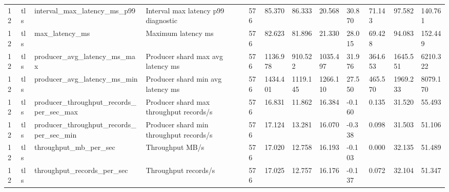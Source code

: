 \begin{longtable}{llllllllllll}
12 & tls & interval\_max\_latency\_ms\_p99 & Interval max latency p99 diagnostic & 576 & 85.370 & 86.333 & 20.568 & 30.870 & 71.143 & 97.582 & 140.761 \\
12 & tls & max\_latency\_ms & Maximum latency ms & 576 & 82.623 & 81.896 & 21.330 & 28.015 & 69.428 & 94.083 & 152.449 \\
12 & tls & producer\_avg\_latency\_ms\_max & Producer shard max avg latency ms & 576 & 1136.978 & 910.522 & 1035.497 & 31.976 & 364.653 & 1645.551 & 6210.322 \\
12 & tls & producer\_avg\_latency\_ms\_min & Producer shard min avg latency ms & 576 & 1434.401 & 1119.145 & 1266.110 & 27.550 & 465.570 & 1969.233 & 8079.170 \\
12 & tls & producer\_throughput\_records\_per\_sec\_max & Producer shard max throughput records/s & 576 & 16.831 & 11.862 & 16.384 & -0.160 & 0.135 & 31.520 & 55.493 \\
12 & tls & producer\_throughput\_records\_per\_sec\_min & Producer shard min throughput records/s & 576 & 17.124 & 13.281 & 16.070 & -0.338 & 0.098 & 31.503 & 51.106 \\
12 & tls & throughput\_mb\_per\_sec & Throughput MB/s & 576 & 17.020 & 12.758 & 16.193 & -0.103 & 0.000 & 32.135 & 51.489 \\
12 & tls & throughput\_records\_per\_sec & Throughput records/s & 576 & 17.025 & 12.757 & 16.176 & -0.137 & 0.072 & 32.104 & 51.347 \\
\hline
\end{longtable}

